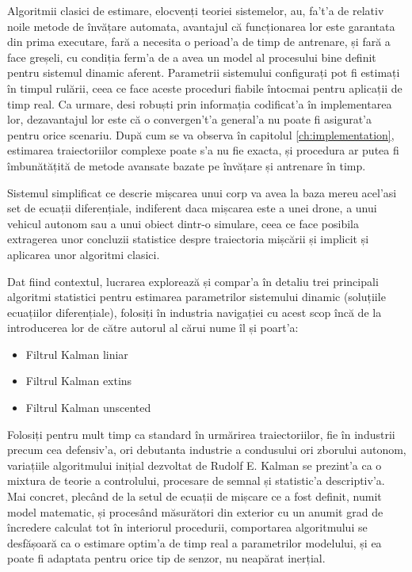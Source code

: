 \documentclass[12pt,a4paper,twoside]{report}
\begin{document}
\vspace{5px}

Algoritmii clasici de estimare, elocvenți teoriei sistemelor, au, fa't'a de relativ noile metode de învățare automata, avantajul că funcționarea lor este garantata din prima executare, fară a necesita o perioad'a de timp de antrenare, și fară a face greșeli, cu condiția ferm'a de a avea un model al procesului bine definit pentru sistemul dinamic aferent. Parametrii sistemului configurați pot fi estimați în timpul rulării, ceea ce face aceste proceduri fiabile întocmai pentru aplicații de timp real. Ca urmare, desi robuști prin informația codificat'a în implementarea lor, dezavantajul lor este că o convergen't'a general'a nu poate fi asigurat'a pentru orice scenariu. După cum se va observa în capitolul \ref{ch:implementation}, estimarea traiectoriilor complexe poate s'a nu fie exacta, și procedura ar putea fi îmbunătățită de metode avansate bazate pe învățare și antrenare în timp.

\vspace{5px}

Sistemul simplificat ce descrie mișcarea unui corp va avea la baza mereu acel'asi set de ecuații diferențiale, indiferent daca mișcarea este a unei drone, a unui vehicul autonom sau a unui obiect dintr-o simulare, ceea ce face posibila extragerea unor concluzii statistice despre traiectoria mișcării și implicit și aplicarea unor algoritmi clasici.

\vspace{5px}

Dat fiind contextul, lucrarea explorează și compar'a în detaliu trei principali algoritmi statistici pentru estimarea parametrilor sistemului dinamic (soluțiile ecuațiilor diferențiale), folosiți în industria navigației cu acest scop încă de la introducerea lor de către autorul al cărui nume îl și poart'a:

\begin{itemize}
  \item Filtrul Kalman liniar
  \item Filtrul Kalman extins
  \item Filtrul Kalman unscented
\end{itemize}

Folosiți pentru mult timp ca standard în urmărirea traiectoriilor, fie în industrii precum cea defensiv'a, ori debutanta industrie a condusului ori zborului autonom, variațiile algoritmului inițial dezvoltat de Rudolf E. Kalman se prezint'a ca o mixtura de teorie a controlului, procesare de semnal și statistic'a descriptiv'a. Mai concret, plecând de la setul de ecuații de mișcare ce a fost definit, numit model matematic, și procesând măsurători din exterior cu un anumit grad de încredere calculat tot în interiorul procedurii, comportarea algoritmului se desfășoară ca o estimare optim'a de timp real a parametrilor modelului, și ea poate fi adaptata pentru orice tip de senzor, nu neapărat inerțial.
\end{document}
